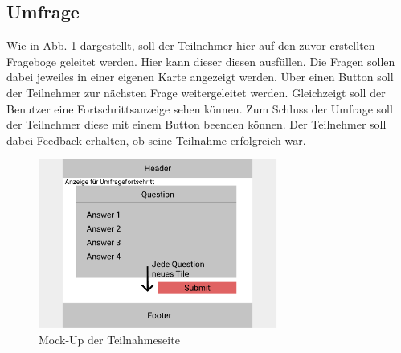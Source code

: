 \subsection{Umfrage}
\label{ssec:konzept:client:umfrage}
Wie in Abb. \ref{fig:MockUmfrageTeilnehmer} dargestellt, soll der Teilnehmer hier auf den zuvor erstellten Frageboge geleitet werden. 
Hier kann dieser diesen ausfüllen.
Die Fragen sollen dabei jeweiles in einer eigenen Karte angezeigt werden.
Über einen Button soll der Teilnehmer zur nächsten Frage weitergeleitet werden. 
Gleichzeigt soll der Benutzer eine Fortschrittsanzeige sehen können.
Zum Schluss der Umfrage soll der Teilnehmer diese mit einem Button beenden können.
Der Teilnehmer soll dabei Feedback erhalten, ob seine Teilnahme erfolgreich war. 

\begin{figure}[H]
	\centering
	\includegraphics[width=0.7\textwidth]{img/konzeption/client/umfrage_teilnehmer}
	\captionsetup{justification=centering, format=plain}
	\caption[Mock-Up der Teilnahmeseite]{Mock-Up der Teilnahmeseite\\\figma}
	\label{fig:MockUmfrageTeilnehmer}
\end{figure}